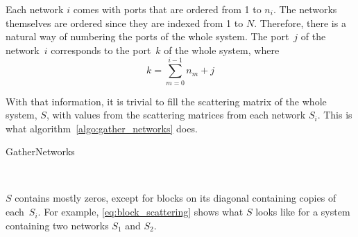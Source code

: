 Each network $i$ comes with ports that are ordered from 1 to $n_i$.
The networks themselves are ordered since they are indexed from 1 to $N$.
Therefore, there is a natural way of numbering the ports of the whole system.
The port~$j$ of the network~$i$ corresponds to the port~$k$ of the whole system, where
\begin{equation}
    k = \sum_{m=0}^{i - 1}n_m + j \label{eq:port_numbering}
\end{equation}

With that information, it is trivial to fill the scattering matrix of the whole system, $S$, with values from the scattering matrices from each network $S_i$.
This is what algorithm~\cref{algo:gather_networks} does.
\begin{algorithm}
    \caption{GatherNetworks}
    \label{algo:gather_networks}
    \begin{algorithmic}
         
         
        \State{}
                
        \EndFor
        \State{}
        \State{}
         
        \EndFor
        \\ 
        \EndFunction
    \end{algorithmic}
\end{algorithm}
$S$ contains mostly zeros, except for blocks on its diagonal containing copies of each~$S_i$.
For example, \cref{eq:block_scattering} shows what $S$ looks like for a system containing two networks $S_1$ and $S_2$.
